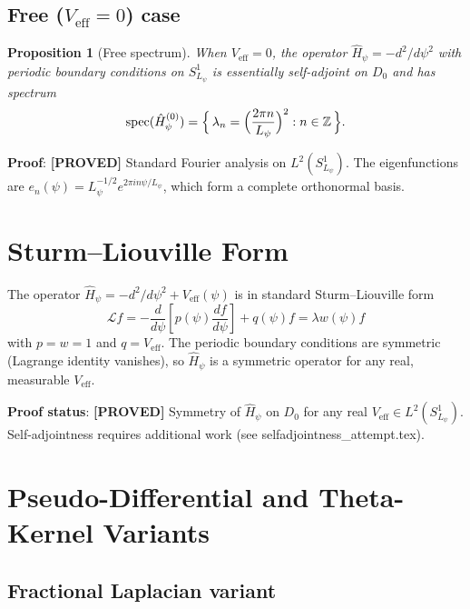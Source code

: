 \documentclass[11pt,a4paper]{article}
\newtheorem{proposition}{Proposition}
\newcommand{\proved}[1]{\textbf{[PROVED]} #1}
\begin{document}
\subsection{Free ($V_\mathrm{eff}=0$) case}

\begin{proposition}[Free spectrum]
  When $V_\mathrm{eff} = 0$, the operator $\hat{H}_\psi = -d^2/d\psi^2$
  with periodic boundary conditions on $S^1_{L_\psi}$ is essentially
  self-adjoint on $D_0$ and has spectrum
  \[
    \operatorname{spec}(\hat{H}_\psi^{(0)})
    = \Bigl\{\, \lambda_n = \Bigl(\frac{2\pi n}{L_\psi}\Bigr)^2 :
    n \in \mathbb{Z} \,\Bigr\}.
  \]
\end{proposition}

\textbf{Proof}: \proved{Standard Fourier analysis on $L^2(S^1_{L_\psi})$.
The eigenfunctions are $e_n(\psi) = L_\psi^{-1/2} e^{2\pi i n\psi/L_\psi}$,
which form a complete orthonormal basis.}

\section{Sturm--Liouville Form}

The operator $\hat{H}_\psi = -d^2/d\psi^2 + V_\mathrm{eff}(\psi)$ is in
standard Sturm--Liouville form
\[
  \mathcal{L}f = -\frac{d}{d\psi}\!\left[p(\psi)\frac{df}{d\psi}\right]
  + q(\psi)f = \lambda w(\psi) f
\]
with $p = w = 1$ and $q = V_\mathrm{eff}$.  The periodic boundary conditions
are symmetric (Lagrange identity vanishes), so $\hat{H}_\psi$ is a symmetric
operator for any real, measurable $V_\mathrm{eff}$.

\textbf{Proof status}: \proved{Symmetry of $\hat{H}_\psi$ on $D_0$ for any
real $V_\mathrm{eff} \in L^2(S^1_{L_\psi})$.  Self-adjointness requires
additional work (see selfadjointness\_attempt.tex).}

\section{Pseudo-Differential and Theta-Kernel Variants}

\subsection{Fractional Laplacian variant}
\label{sec:pseudodiff}
\end{document}
